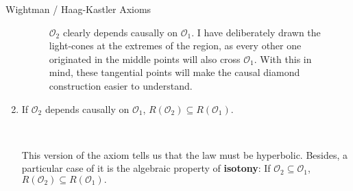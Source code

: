 \documentclass[12pt]{article}
\begin{document}
\begin{section}{Wightman / Haag-Kastler Axioms}
\begin{enumerate}
\begin{figure}[H]
\centering
{}
\caption{$\mathcal{O}_2$ clearly depends causally on $\mathcal{O}_1$. I have deliberately drawn the light-cones at the extremes of the region, as every other one originated in the middle points will also cross $\mathcal{O}_1$. With this in mind, these tangential points will make the causal diamond construction easier to understand.}
\label{cause}
\end{figure}

\item If $\mathcal{O}_2$ depends causally on $\mathcal{O}_1$, $R(\mathcal{O}_2) \subseteq R(\mathcal{O}_1)$.

\

This version of the axiom tells us that the law must be hyperbolic. Besides, a particular case of it is the algebraic property of \textbf{isotony}: If $\mathcal{O}_2 \subseteq \mathcal{O}_1$, $R(\mathcal{O}_2) \subseteq R(\mathcal{O}_1).$

\end{enumerate}

\end{section}
\end{document}
